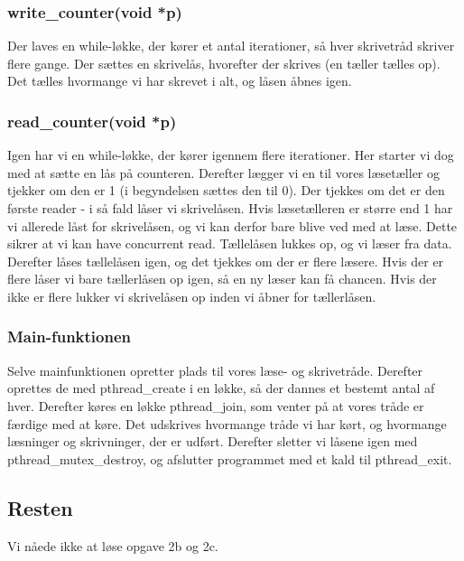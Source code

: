 \documentclass[10pt,a4paper,danish]{article}
\begin{document}
\subsubsection{write\_counter(void *p)}
Der laves en while-løkke, der kører et antal iterationer, så hver skrivetråd skriver flere gange. Der sættes en skrivelås, hvorefter der skrives (en tæller tælles op). Det tælles hvormange vi har skrevet i alt, og låsen åbnes igen.

\subsubsection{read\_counter(void *p)}
Igen har vi en while-løkke, der kører igennem flere iterationer. Her starter vi dog med at sætte en lås på counteren. Derefter lægger vi en til vores læsetæller og tjekker om den er 1 (i begyndelsen sættes den til 0). Der tjekkes om det er den første reader - i så fald låser vi skrivelåsen. Hvis læsetælleren er større end 1 har vi allerede låst for skrivelåsen, og vi kan derfor bare blive ved med at læse. Dette sikrer at vi kan have concurrent read. Tællelåsen lukkes op, og vi læser fra data. Derefter låses tællelåsen igen, og det tjekkes om der er flere læsere. Hvis der er flere låser vi bare tællerlåsen op igen, så en ny læser kan få chancen. Hvis der ikke er flere lukker vi skrivelåsen op inden vi åbner for tællerlåsen.

\subsubsection{Main-funktionen}
Selve mainfunktionen opretter plads til vores læse- og skrivetråde. Derefter oprettes de med pthread\_create i en løkke, så der dannes et bestemt antal af hver. Derefter køres en løkke pthread\_join, som venter på at vores tråde er færdige med at køre. Det udskrives hvormange tråde vi har kørt, og hvormange læsninger og skrivninger, der er udført. Derefter sletter vi låsene igen med pthread\_mutex\_destroy, og afslutter programmet med et kald til pthread\_exit.

\subsection{Resten}
Vi nåede ikke at løse opgave 2b og 2c.
\end{document}
